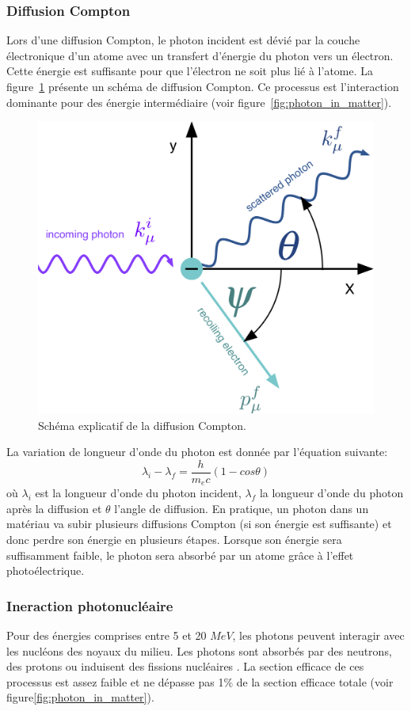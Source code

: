 \subsubsection{Diffusion Compton}
Lors d'une diffusion Compton, le photon incident est dévié par la couche électronique d'un atome avec un transfert d'énergie du photon vers un électron. Cette énergie est suffisante pour que l'électron ne soit plus lié à l'atome. La figure~\ref{fig:compton_scattering} présente un schéma de diffusion Compton. Ce processus est l'interaction dominante pour des énergie intermédiaire (voir figure~\ref{fig:photon_in_matter}).
\begin{figure}[!h]
  \begin{center}
    \includegraphics[width=.4\textwidth]{ShowerTh/figs/compton_scattering.png}
    \caption{Schéma explicatif de la diffusion Compton.}
    \label{fig:compton_scattering}
  \end{center}
\end{figure}
La variation de longueur d'onde du photon est donnée par l'équation suivante:
\begin{equation}
  \label{eq.compton}
  \lambda_i-\lambda_f=\frac{h}{m_ec}(1-cos\theta)
\end{equation}
où $\lambda_i$ est la longueur d'onde du photon incident, $\lambda_f$ la longueur d'onde du photon après la diffusion et $\theta$ l'angle de diffusion. En pratique, un photon dans un matériau va subir plusieurs diffusions Compton (si son énergie est suffisante) et donc perdre son énergie en plusieurs étapes. Lorsque son énergie sera suffisamment faible, le photon sera absorbé par un atome grâce à l'effet photoélectrique. 

\subsubsection{Ineraction photonucléaire}
Pour des énergies comprises entre 5 et 20 $MeV$, les photons peuvent interagir avec les nucléons des noyaux du milieu. Les photons sont absorbés par des neutrons, des protons ou induisent des fissions nucléaires \cite{wigmans}. La section efficace de ces processus est assez faible et ne dépasse pas 1$\%$ de la section efficace totale (voir figure\ref{fig:photon_in_matter}).

